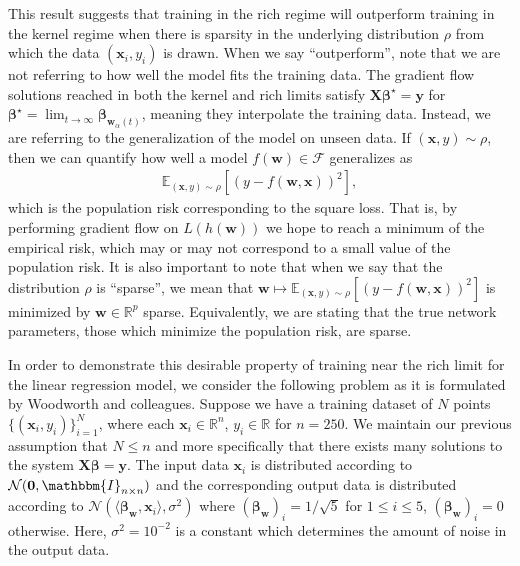 \documentclass{article}
\begin{document}
This result suggests that training in the rich regime will outperform training in the kernel regime when there is sparsity in the underlying distribution $\rho$ from which the data $(\boldsymbol{x}_i, y_i)$ is drawn. When we say \enquote{outperform}, note that we are not referring to how well the model fits the training data. The gradient flow solutions reached in both the kernel and rich limits satisfy $\boldsymbol{X}\boldsymbol{\beta}^{\star} = \boldsymbol{y}$ for $\boldsymbol{\beta}^{\star} = \lim_{t \to \infty} \boldsymbol{\beta}_{\boldsymbol{w}_{\alpha}(t)}$, meaning they interpolate the training data. Instead, we are referring to the generalization of the model on unseen data. If $(\boldsymbol{x}, y) \sim \rho$, then we can quantify how well a model $f(\boldsymbol{w}) \in \mathcal{F}$ generalizes as
\begin{align}\label{poprisk}
\mathbb{E}_{(\boldsymbol{x}, y) \sim \rho}[(y - f(\boldsymbol{w}, \boldsymbol{x}))^2],
\end{align}
which is the population risk corresponding to the square loss. That is, by performing gradient flow on $L(h(\boldsymbol{w}))$ we hope to reach a minimum of the empirical risk, which may or may not correspond to a small value of the population risk. It is also important to note that when we say that the distribution $\rho$ is \enquote{sparse}, we mean that $\boldsymbol{w} \mapsto \mathbb{E}_{(\boldsymbol{x}, y) \sim \rho}[(y - f(\boldsymbol{w}, \boldsymbol{x}))^2]$ is minimized by $\boldsymbol{w} \in \mathbb{R}^p$ sparse. Equivalently, we are stating that the true network parameters, those which minimize the population risk, are sparse. 

In order to demonstrate this desirable property of training near the rich limit for the linear regression model, we consider the following problem as it is formulated by Woodworth and colleagues. Suppose we have a training dataset of $N$ points $\{(\boldsymbol{x}_i, y_i)\}_{i=1}^N$, where each $\boldsymbol{x}_i \in \mathbb{R}^n$, $y_i \in \mathbb{R}$ for $n = 250$. We maintain our previous assumption that $N \leq n$ and more specifically that there exists many solutions to the system $\boldsymbol{X}\boldsymbol{\beta} = \boldsymbol{y}$. The input data $\boldsymbol{x}_i$ is distributed according to $\mathcal{N}(\boldsymbol{0},\mathbbm{I}_{n \times n})$ and the corresponding output data is distributed according to $\mathcal{N}(\langle \boldsymbol{\beta}_{\boldsymbol{w}}, \boldsymbol{x}_i \rangle, \sigma^2)$ where $(\boldsymbol{\beta}_{\boldsymbol{w}})_i = 1/\sqrt{5}$ for $1 \leq i \leq 5$, $(\boldsymbol{\beta}_{\boldsymbol{w}})_i = 0$ otherwise. Here, $\sigma^2 = 10^{-2}$ is a constant which determines the amount of noise in the output data.
\end{document}
